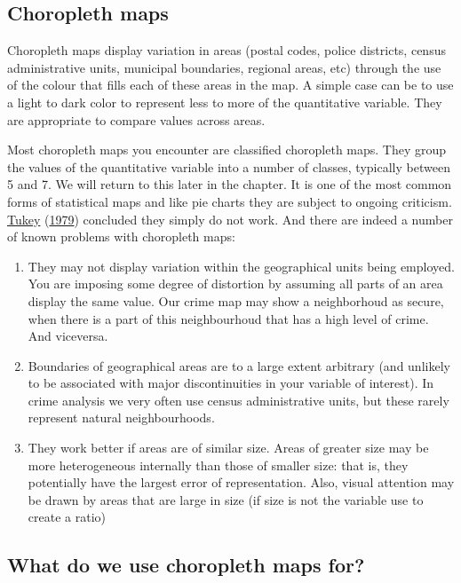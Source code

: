 \documentclass[
]{book}
\begin{document}
\hypertarget{choropleth-maps}{%
\subsection{Choropleth maps}\label{choropleth-maps}}

Choropleth maps display variation in areas (postal codes, police districts, census administrative units, municipal boundaries, regional areas, etc) through the use of the colour that fills each of these areas in the map. A simple case can be to use a light to dark color to represent less to more of the quantitative variable. They are appropriate to compare values across areas.

Most choropleth maps you encounter are classified choropleth maps. They group the values of the quantitative variable into a number of classes, typically between 5 and 7. We will return to this later in the chapter. It is one of the most common forms of statistical maps and like pie charts they are subject to ongoing criticism. \protect\hyperlink{ref-Tukey_1979}{Tukey} (\protect\hyperlink{ref-Tukey_1979}{1979}) concluded they simply do not work. And there are indeed a number of known problems with choropleth maps:

\begin{enumerate}
\def\labelenumi{\arabic{enumi}.}
\item
  They may not display variation within the geographical units being employed. You are imposing some degree of distortion by assuming all parts of an area display the same value. Our crime map may show a neighborhoud as secure, when there is a part of this neighbourhoud that has a high level of crime. And viceversa.
\item
  Boundaries of geographical areas are to a large extent arbitrary (and unlikely to be associated with major discontinuities in your variable of interest). In crime analysis we very often use census administrative units, but these rarely represent natural neighbourhoods.
\item
  They work better if areas are of similar size. Areas of greater size may be more heterogeneous internally than those of smaller size: that is, they potentially have the largest error of representation. Also, visual attention may be drawn by areas that are large in size (if size is not the variable use to create a ratio)
\end{enumerate}

\hypertarget{what-do-we-use-choropleth-maps-for}{%
\subsection{What do we use choropleth maps for?}\label{what-do-we-use-choropleth-maps-for}}
\end{document}
